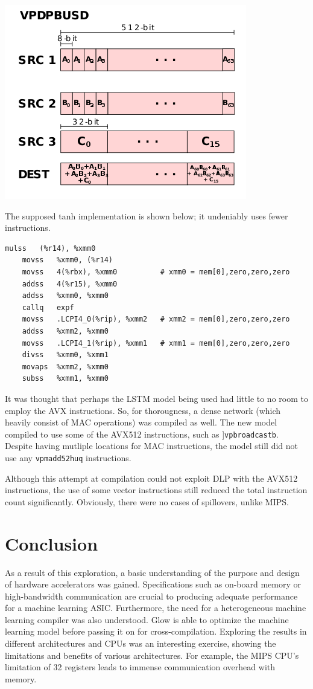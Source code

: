 \documentclass[twocolumn]{article}
\newcommand{\cc}[1]{\texttt{#1}}
\begin{document}
 \begingroup
    \centering
    \medskip
    \includegraphics[width=0.5\columnwidth]{Lab-Tex/final/vnni.png}
    \label{fig:graph_rep}
    \medskip
\endgroup

The supposed tanh implementation is shown below; it undeniably uses fewer instructions.

\begin{lstlisting}
mulss	(%r14), %xmm0
	movss	%xmm0, (%r14)
	movss	4(%rbx), %xmm0          # xmm0 = mem[0],zero,zero,zero
	addss	4(%r15), %xmm0
	addss	%xmm0, %xmm0
	callq	expf
	movss	.LCPI4_0(%rip), %xmm2   # xmm2 = mem[0],zero,zero,zero
	addss	%xmm2, %xmm0
	movss	.LCPI4_1(%rip), %xmm1   # xmm1 = mem[0],zero,zero,zero
	divss	%xmm0, %xmm1
	movaps	%xmm2, %xmm0
	subss	%xmm1, %xmm0
\end{lstlisting}

It was thought that perhaps the LSTM model being used had little to no room to employ the AVX instructions. So, for thorougness, a dense network (which heavily consist of MAC operations) was compiled as well. The new model compiled to use some of the AVX512 instructions, such as ]\cc{vpbroadcastb}. Despite having mutliple locations for MAC instructions, the model still did not use any \cc{vpmadd52huq} instructions.

Although this attempt at compilation could not exploit DLP with the AVX512 instructions, the use of some vector instructions still reduced the total instruction count significantly. Obviously, there were no cases of spillovers, unlike MIPS. 

\section{Conclusion}

As a result of this exploration, a basic understanding of the purpose and design of hardware accelerators was gained. Specifications such as on-board memory or high-bandwidth communication are crucial to producing adequate performance for a machine learning ASIC. Furthermore, the need for a heterogeneous machine learning compiler was also understood. Glow is able to optimize the machine learning model before passing it on for cross-compilation. Exploring the results in different architectures and CPUs was an interesting exercise, showing the limitations and benefits of various architectures. For example, the MIPS CPU's limitation of 32 registers leads to immense communication overhead with memory. \\
\end{document}
